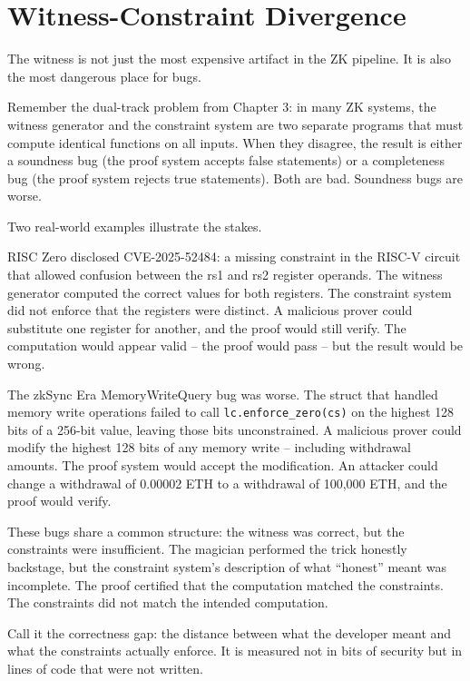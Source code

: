 \documentclass[
  11pt,
  openany]{report}
\begin{document}
\section{Witness-Constraint Divergence}\label{witness-constraint-divergence}

The witness is not just the most expensive artifact in the ZK pipeline. It is
also the most dangerous place for bugs.

Remember the dual-track problem from Chapter 3: in many ZK systems, the witness
generator and the constraint system are two separate programs that must compute
identical functions on all inputs. When they disagree, the result is either a
soundness bug (the proof system accepts false statements) or a completeness bug
(the proof system rejects true statements). Both are bad. Soundness bugs are
worse.

Two real-world examples illustrate the stakes.

RISC Zero disclosed CVE-2025-52484: a missing constraint in the RISC-V circuit
that allowed confusion between the rs1 and rs2 register operands. The witness
generator computed the correct values for both registers. The constraint system
did not enforce that the registers were distinct. A malicious prover could
substitute one register for another, and the proof would still verify. The
computation would appear valid -- the proof would pass -- but the result would
be wrong.

The zkSync Era MemoryWriteQuery bug was worse. The struct that handled memory
write operations failed to call \texttt{lc.enforce\_zero(cs)} on the highest 128
bits of a 256-bit value, leaving those bits unconstrained. A malicious prover
could modify the highest 128 bits of any memory write -- including withdrawal
amounts. The proof system would accept the modification. An attacker could
change a withdrawal of 0.00002 ETH to a withdrawal of 100,000 ETH, and the proof
would verify.

These bugs share a common structure: the witness was correct, but the
constraints were insufficient. The magician performed the trick honestly
backstage, but the constraint system's description of what ``honest'' meant was
incomplete. The proof certified that the computation matched the constraints.
The constraints did not match the intended computation.

Call it the correctness gap: the distance between what the developer meant and
what the constraints actually enforce. It is measured not in bits of security
but in lines of code that were not written.
\end{document}

